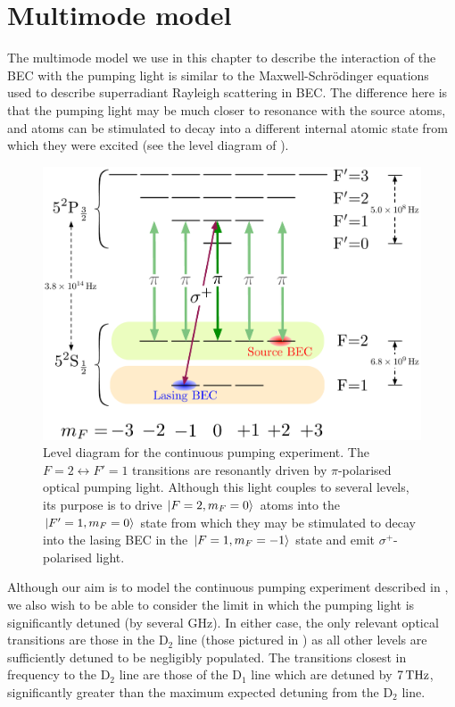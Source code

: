 \section{Multimode model}
\label{OpticalPumping:MultimodeModel}

The multimode model we use in this chapter to describe the interaction of the BEC with the pumping light is similar to the Maxwell-Schrödinger equations \citep{Zobay:2005,Zobay:2006} used to describe superradiant Rayleigh scattering in BEC.  The difference here is that the pumping light may be much closer to resonance with the source atoms, and atoms can be stimulated to decay into a different internal atomic state from which they were excited (see the level diagram of ).

\begin{figure}
    \centering
    \includegraphics[width=13cm]{LevelDiagram}
    \caption{Level diagram for the continuous pumping experiment.  The $F=2 \leftrightarrow F'=1$ transitions are resonantly driven by $\pi$-polarised optical pumping light.  Although this light couples to several levels, its purpose is to drive ${\left|F=2, m_F=0\right>}$ atoms into the ${\left|F'=1, m_F=0\right>}$ state from which they may be stimulated to decay into the lasing BEC in the ${\left|F=1, m_F=-1\right>}$ state and emit $\sigma^+$-polarised light.}
    \label{OpticalPumping:LevelDiagram}
\end{figure}

Although our aim is to model the continuous pumping experiment described in , we also wish to be able to consider the limit in which the pumping light is significantly detuned (by several GHz).  In either case, the only relevant optical transitions are those in the $\text{D}_2$ line (those pictured in ) as all other levels are sufficiently detuned to be negligibly populated.  The transitions closest in frequency to the $\text{D}_2$ line are those of the $\text{D}_1$ line which are detuned by $\unit[7]{THz}$, significantly greater than the maximum expected detuning from the $\text{D}_2$ line.


